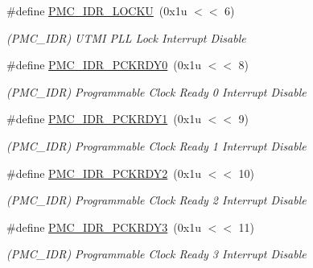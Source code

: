 \begin{DoxyCompactItemize}
\mbox{\label{group__SAMV71__PMC_ga313fb194776f6a326f91150df714f990}} 
\#define \mbox{\hyperlink{group__SAMV71__PMC_ga313fb194776f6a326f91150df714f990}{P\+M\+C\+\_\+\+I\+D\+R\+\_\+\+L\+O\+C\+KU}}~(0x1u $<$$<$ 6)
\begin{DoxyCompactList}\small\item\em (P\+M\+C\+\_\+\+I\+DR) U\+T\+MI P\+LL Lock Interrupt Disable \end{DoxyCompactList}\item 
\mbox{\label{group__SAMV71__PMC_gac6c95ab23e8b9ad179d3db96fa6c5d7b}} 
\#define \mbox{\hyperlink{group__SAMV71__PMC_gac6c95ab23e8b9ad179d3db96fa6c5d7b}{P\+M\+C\+\_\+\+I\+D\+R\+\_\+\+P\+C\+K\+R\+D\+Y0}}~(0x1u $<$$<$ 8)
\begin{DoxyCompactList}\small\item\em (P\+M\+C\+\_\+\+I\+DR) Programmable Clock Ready 0 Interrupt Disable \end{DoxyCompactList}\item 
\mbox{\label{group__SAMV71__PMC_ga41d50baa84ca59665f79584f6c769f54}} 
\#define \mbox{\hyperlink{group__SAMV71__PMC_ga41d50baa84ca59665f79584f6c769f54}{P\+M\+C\+\_\+\+I\+D\+R\+\_\+\+P\+C\+K\+R\+D\+Y1}}~(0x1u $<$$<$ 9)
\begin{DoxyCompactList}\small\item\em (P\+M\+C\+\_\+\+I\+DR) Programmable Clock Ready 1 Interrupt Disable \end{DoxyCompactList}\item 
\mbox{\label{group__SAMV71__PMC_ga3b5f0b5c79321b5b99ab7f2fdeda0ed1}} 
\#define \mbox{\hyperlink{group__SAMV71__PMC_ga3b5f0b5c79321b5b99ab7f2fdeda0ed1}{P\+M\+C\+\_\+\+I\+D\+R\+\_\+\+P\+C\+K\+R\+D\+Y2}}~(0x1u $<$$<$ 10)
\begin{DoxyCompactList}\small\item\em (P\+M\+C\+\_\+\+I\+DR) Programmable Clock Ready 2 Interrupt Disable \end{DoxyCompactList}\item 
\mbox{\label{group__SAMV71__PMC_ga03a07ac60c6f4bcfa4b7d6aaafa462eb}} 
\#define \mbox{\hyperlink{group__SAMV71__PMC_ga03a07ac60c6f4bcfa4b7d6aaafa462eb}{P\+M\+C\+\_\+\+I\+D\+R\+\_\+\+P\+C\+K\+R\+D\+Y3}}~(0x1u $<$$<$ 11)
\begin{DoxyCompactList}\small\item\em (P\+M\+C\+\_\+\+I\+DR) Programmable Clock Ready 3 Interrupt Disable \end{DoxyCompactList}\item 
$$
\end{DoxyCompactItemize}
